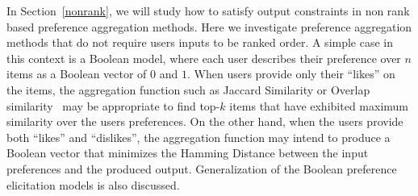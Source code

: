 \documentclass[11pt]{article}
\begin{document}

\smallskip \noindent In Section~\ref{nonrank}, we will study how to satisfy output constraints in non rank based preference aggregation methods.
Here we investigate preference aggregation methods that do not require users inputs to be ranked order. A simple case in this context is a Boolean model, where each user describes their preference over $n$ items as a Boolean vector of $0$ and $1$. When users provide only their ``likes'' on the items, the aggregation function such as Jaccard Similarity or Overlap similarity~\cite{roy2014exploiting} may be appropriate to find top-$k$ items that have exhibited maximum similarity over the users preferences. On the other hand, when the users provide both ``likes'' and ``dislikes'', the aggregation function may intend to produce a Boolean vector that minimizes the Hamming Distance between the input preferences and the produced output. Generalization of the Boolean preference elicitation models is also discussed.

\end{document}
